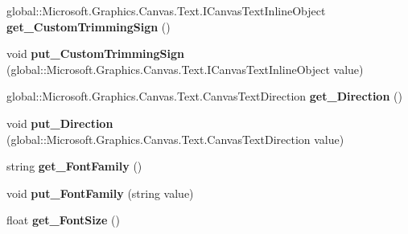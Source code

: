 \begin{DoxyCompactItemize}
global\+::\+Microsoft.\+Graphics.\+Canvas.\+Text.\+I\+Canvas\+Text\+Inline\+Object {\bfseries get\+\_\+\+Custom\+Trimming\+Sign} ()
\item 
\mbox{\label{interface_microsoft_1_1_graphics_1_1_canvas_1_1_text_1_1_i_canvas_text_format_aefe2238d3d79706b8cfa6e70171a651c}} 
void {\bfseries put\+\_\+\+Custom\+Trimming\+Sign} (global\+::\+Microsoft.\+Graphics.\+Canvas.\+Text.\+I\+Canvas\+Text\+Inline\+Object value)
\item 
\mbox{\label{interface_microsoft_1_1_graphics_1_1_canvas_1_1_text_1_1_i_canvas_text_format_ad08083df7e2d44e9c7e2515e41680d6c}} 
global\+::\+Microsoft.\+Graphics.\+Canvas.\+Text.\+Canvas\+Text\+Direction {\bfseries get\+\_\+\+Direction} ()
\item 
\mbox{\label{interface_microsoft_1_1_graphics_1_1_canvas_1_1_text_1_1_i_canvas_text_format_ae3d774c44911dc8c0de1180ace93d9a4}} 
void {\bfseries put\+\_\+\+Direction} (global\+::\+Microsoft.\+Graphics.\+Canvas.\+Text.\+Canvas\+Text\+Direction value)
\item 
\mbox{\label{interface_microsoft_1_1_graphics_1_1_canvas_1_1_text_1_1_i_canvas_text_format_a8fe1529664d2dfc46f799ee6b186b187}} 
string {\bfseries get\+\_\+\+Font\+Family} ()
\item 
\mbox{\label{interface_microsoft_1_1_graphics_1_1_canvas_1_1_text_1_1_i_canvas_text_format_a69caecba006870d1082bccc391fe1ffd}} 
void {\bfseries put\+\_\+\+Font\+Family} (string value)
\item 
\mbox{\label{interface_microsoft_1_1_graphics_1_1_canvas_1_1_text_1_1_i_canvas_text_format_a2179dacf6c7f28ebcfd811d8b0b3c56b}} 
float {\bfseries get\+\_\+\+Font\+Size} ()
\item 
\mbox{\label{interface_microsoft_1_1_graphics_1_1_canvas_1_1_text_1_1_i_canvas_text_format_a8362a30e758e319e0a809612f7ae588c}} 

\end{DoxyCompactItemize}
